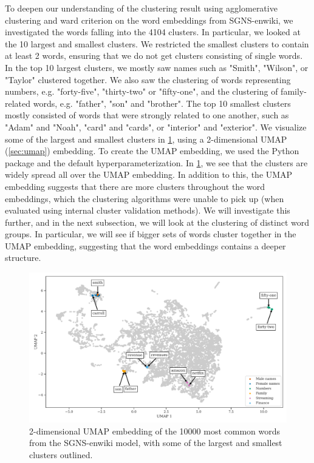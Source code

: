 To deepen our understanding of the clustering result using agglomerative clustering and ward criterion on the word embeddings from SGNS-enwiki, we investigated the words falling into the 4104 clusters. In particular, we looked at the 10 largest and smallest clusters. We restricted the smallest clusters to contain at least 2 words, ensuring that we do not get clusters consisting of single words. In the top 10 largest clusters, we mostly saw names such as "Smith", "Wilson", or "Taylor" clustered together. We also saw the clustering of words representing numbers, e.g. "forty-five", "thirty-two" or "fifty-one", and the clustering of family-related words, e.g. "father", "son" and "brother". The top 10 smallest clusters mostly consisted of words that were strongly related to one another, such as "Adam" and "Noah", "card" and "cards", or "interior" and "exterior". We visualize some of the largest and smallest clusters in \cref{fig:cluster-analysis-agglomerative-2d-umap-top-clusters}, using a 2-dimensional UMAP (\cref{sec:umap}) embedding. To create the UMAP embedding, we used the  Python package \cite{mcinnes2018umap-software} and the default hyperparameterization. In \cref{fig:cluster-analysis-agglomerative-2d-umap-top-clusters}, we see that the clusters are widely spread all over the UMAP embedding. In addition to this, the UMAP embedding suggests that there are more clusters throughout the word embeddings, which the clustering algorithms were unable to pick up (when evaluated using internal cluster validation methods). We will investigate this further, and in the next subsection, we will look at the clustering of distinct word groups. In particular, we will see if bigger sets of words cluster together in the UMAP embedding, suggesting that the word embeddings contains a deeper structure.
\begin{figure}
    \centering
    \includegraphics[width=\textwidth]{thesis/figures/cluster-analysis-agglomerative-2d-umap-top-clusters.pdf}
    \caption{2-dimensional UMAP embedding of the 10000 most common words from the SGNS-enwiki model, with some of the largest and smallest clusters outlined.}
    \label{fig:cluster-analysis-agglomerative-2d-umap-top-clusters}
\end{figure}

